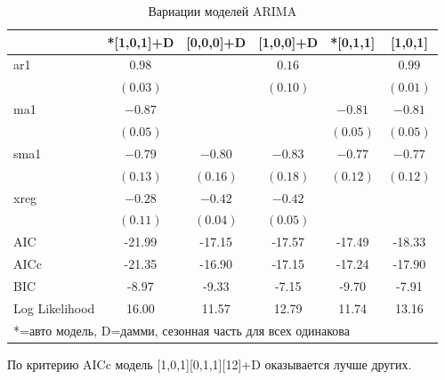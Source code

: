 \documentclass[14pt, a4paper]{extarticle}\usepackage[]{graphicx}\usepackage[]{color}
\begin{document}
\begin{table}[h]
\begin{center}
\begin{tabular}{l c c c c c }
\hline
 & *[1,0,1]+D & [0,0,0]+D & [1,0,0]+D & *[0,1,1] & [1,0,1] \\
\hline
ar1            & $0.98$   &          & $0.16$   &          & $0.99$   \\
               & $(0.03)$ &          & $(0.10)$ &          & $(0.01)$ \\
ma1            & $-0.87$  &          &          & $-0.81$  & $-0.81$  \\
               & $(0.05)$ &          &          & $(0.05)$ & $(0.05)$ \\
sma1           & $-0.79$  & $-0.80$  & $-0.83$  & $-0.77$  & $-0.77$  \\
               & $(0.13)$ & $(0.16)$ & $(0.18)$ & $(0.12)$ & $(0.12)$ \\
xreg           & $-0.28$  & $-0.42$  & $-0.42$  &          &          \\
               & $(0.11)$ & $(0.04)$ & $(0.05)$ &          &          \\
\hline
AIC            & -21.99   & -17.15   & -17.57   & -17.49   & -18.33   \\
AICc           & -21.35   & -16.90   & -17.15   & -17.24   & -17.90   \\
BIC            & -8.97    & -9.33    & -7.15    & -9.70    & -7.91    \\
Log Likelihood & 16.00    & 11.57    & 12.79    & 11.74    & 13.16    \\
\hline
\multicolumn{6}{l}{\scriptsize{*=авто модель, D=дамми, сезонная часть для всех одинакова}}
\end{tabular}
\caption{Вариации моделей ARIMA}
\label{table:coefficients}
\end{center}
\end{table}



По критерию AICc модель [1,0,1][0,1,1][12]+D оказывается лучше других. 
\end{document}
